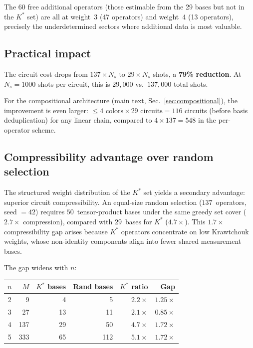 \documentclass[twocolumn,prx,aps,superscriptaddress,longbibliography,floatfix]{revtex4-2}
\begin{document}
The 60 free additional operators (those estimable from the 29 bases
but not in the $K^*$ set) are all at weight~3 (47 operators) and
weight~4 (13 operators), precisely the underdetermined sectors
where additional data is most valuable.

\subsection{Practical impact}

The circuit cost drops from $137 \times N_s$ to $29 \times N_s$
shots, a \textbf{79\% reduction}.  At $N_s = 1000$ shots per
circuit, this is $29{,}000$ vs.\ $137{,}000$ total shots.

For the compositional architecture (main text, Sec.~\ref{sec:compositional}), the
improvement is even larger: $\le 4 \text{ colors} \times 29
\text{ circuits} = 116$ circuits (before basis deduplication)
for any linear chain, compared
to $4 \times 137 = 548$ in the per-operator scheme.

\subsection{Compressibility advantage over random selection}
\label{sec:compression-advantage}

The structured weight distribution of the $K^*$ set yields a
secondary advantage: superior circuit compressibility.
An equal-size random selection ($137$~operators, seed $= 42$)
requires $50$~tensor-product bases under the same greedy set
cover ($2.7\times$ compression), compared with $29$~bases for
$K^*$ ($4.7\times$).  This $1.7\times$ compressibility gap
arises because $K^*$ operators concentrate on low Krawtchouk
weights, whose non-identity components align into fewer shared
measurement bases.

The gap widens with $n$:

\begin{center}
\begin{tabular}{crrrrr}
\toprule
$n$ & $M$ & $K^*$ bases & Rand bases & $K^*$ ratio & Gap \\
\midrule
2 &   9 &  4 &  5 & $2.2\times$ & $1.25\times$ \\
3 &  27 & 13 & 11 & $2.1\times$ & $0.85\times$ \\
4 & 137 & 29 & 50 & $4.7\times$ & $1.72\times$ \\
5 & 333 & 65 & 112 & $5.1\times$ & $1.72\times$ \\
\bottomrule
\end{tabular}
\end{center}
\end{document}
